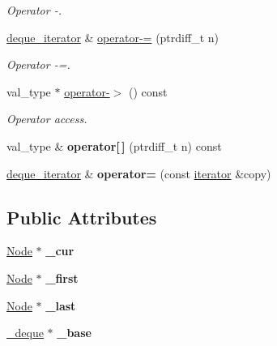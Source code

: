 \begin{DoxyCompactItemize}
\begin{DoxyCompactList}\small\item\em Operator -\/. \end{DoxyCompactList}\item 
\hyperlink{structdeque__iterator}{deque\+\_\+iterator} \& \hyperlink{structdeque__iterator_a1f10cb3090b780023a1454594cae75ca}{operator-\/=} (ptrdiff\+\_\+t n)
\begin{DoxyCompactList}\small\item\em Operator -\/=. \end{DoxyCompactList}\item 
val\+\_\+type $\ast$ \hyperlink{structdeque__iterator_a454c668b6534c8139be843165a5d1c9e}{operator-\/$>$} () const
\begin{DoxyCompactList}\small\item\em Operator access. \end{DoxyCompactList}\item 
\hypertarget{structdeque__iterator_aca87f964d489d8242040cd1c226f82e6}{}\label{structdeque__iterator_aca87f964d489d8242040cd1c226f82e6} 
val\+\_\+type \& {\bfseries operator\mbox{[}$\,$\mbox{]}} (ptrdiff\+\_\+t n) const
\item 
\hypertarget{structdeque__iterator_ac8c185706f46d4149e45649f85b9a4e4}{}\label{structdeque__iterator_ac8c185706f46d4149e45649f85b9a4e4} 
\hyperlink{structdeque__iterator}{deque\+\_\+iterator} \& {\bfseries operator=} (const \hyperlink{structdeque__iterator}{iterator} \&copy)
\end{DoxyCompactItemize}
\subsection*{Public Attributes}
\begin{DoxyCompactItemize}
\item 
\hypertarget{structdeque__iterator_a3ad8d3bfae3fd55a466a90e29f34e8f0}{}\label{structdeque__iterator_a3ad8d3bfae3fd55a466a90e29f34e8f0} 
\hyperlink{structnode}{Node} $\ast$ {\bfseries \+\_\+cur}
\item 
\hypertarget{structdeque__iterator_a1af9831fe2a0209c7ef3bffceb619e64}{}\label{structdeque__iterator_a1af9831fe2a0209c7ef3bffceb619e64} 
\hyperlink{structnode}{Node} $\ast$ {\bfseries \+\_\+first}
\item 
\hypertarget{structdeque__iterator_a9328ab34e070900f07e7393296d3a974}{}\label{structdeque__iterator_a9328ab34e070900f07e7393296d3a974} 
\hyperlink{structnode}{Node} $\ast$ {\bfseries \+\_\+last}
\item 
\hypertarget{structdeque__iterator_aff3cc2ab4b8c4e0ce18beb55c5176f44}{}\label{structdeque__iterator_aff3cc2ab4b8c4e0ce18beb55c5176f44} 
\hyperlink{classdeque__base}{\+\_\+deque} $\ast$ {\bfseries \+\_\+base}
\end{DoxyCompactItemize}


